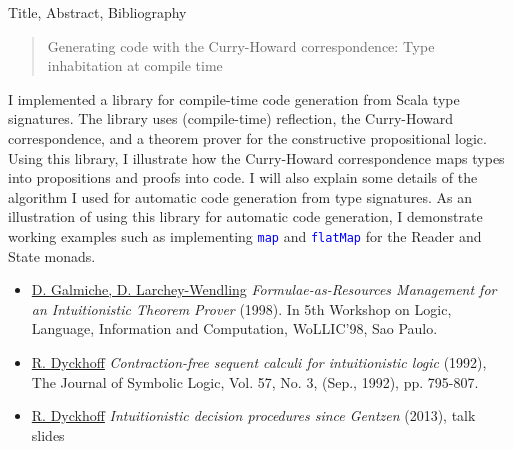 \documentclass[english]{beamer}
\begin{document}
\begin{frame}{Title, Abstract, Bibliography}

\begin{quotation}
Generating code with the Curry-Howard correspondence: Type inhabitation
at compile time
\end{quotation}
{\footnotesize{}I implemented a library for compile-time code generation
from Scala type signatures. The library uses (compile-time) reflection,
the Curry-Howard correspondence, and a theorem prover for the constructive
propositional logic. Using this library, I illustrate how the Curry-Howard
correspondence maps types into propositions and proofs into code.
I will also explain some details of the algorithm I used for automatic
code generation from type signatures. As an illustration of using
this library for automatic code generation, I demonstrate working
examples such as implementing }\texttt{\textcolor{blue}{\footnotesize{}map}}{\footnotesize{}
and }\texttt{\textcolor{blue}{\footnotesize{}flatMap}}{\footnotesize{}
for the Reader and State monads.}{\footnotesize \par}
\begin{itemize}
\item {\footnotesize{}\href{http://citeseer.ist.psu.edu/viewdoc/summary?doi=10.1.1.35.2618}{D. Galmiche, D. Larchey-Wendling}
\textendash{} }\emph{\footnotesize{}Formulae-as-Resources Management
for an Intuitionistic Theorem Prover}{\footnotesize{} (1998). In 5th
Workshop on Logic, Language, Information and Computation, WoLLIC'98,
Sao Paulo.}{\footnotesize \par}
\item {\footnotesize{}\href{https://rd.host.cs.st-andrews.ac.uk/publications/jsl57.pdf}{R. Dyckhoff}
\textendash{} }\emph{\footnotesize{}Contraction-free sequent calculi
for intuitionistic logic}{\footnotesize{} (1992), The Journal of Symbolic
Logic, Vol. 57, No. 3, (Sep., 1992), pp. 795-807.}{\footnotesize \par}
\item {\footnotesize{}\href{http://apt13.unibe.ch/slides/Dyckhoff.pdf}{R. Dyckhoff}
\textendash{} }\emph{\footnotesize{}Intuitionistic decision procedures
since Gentzen}{\footnotesize{} (2013), talk slides}{\footnotesize \par}
\end{itemize}
\end{frame}
\end{document}
